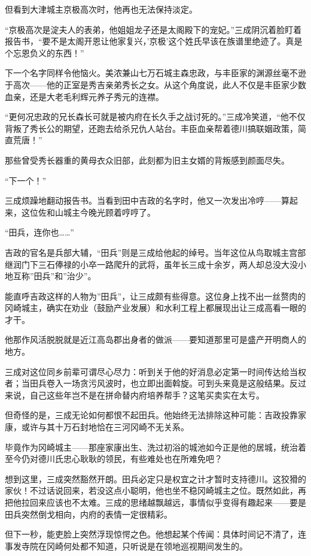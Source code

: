 \documentclass[
]{article}
\begin{document}
但看到大津城主京极高次时，他再也无法保持淡定。

``京极高次是淀夫人的表弟，他姐姐龙子还是太阁殿下的宠妃。''三成阴沉着脸盯着报告书，``要不是太阁开恩让他家复兴，'京极'这个姓氏早该在族谱里绝迹了。真是个忘恩负义的东西！''

下一个名字同样令他恼火。美浓兼山七万石城主森忠政，与丰臣家的渊源丝毫不逊于高次------他的正室是秀吉亲弟秀长之女。从这个角度说，此人不仅是丰臣家少数血亲，还是大老毛利辉元养子秀元的连襟。

``更何况忠政的兄长森长可就是被内府在长久手之战讨死的。''三成冷笑道，``他不仅背叛了秀长公的期望，还跑去给杀兄仇人站台。丰臣血亲帮着德川搞联姻政策，简直荒唐！''

那些曾受秀长器重的黄母衣众旧部，此刻都为旧主女婿的背叛感到颜面尽失。

``下一个！''

三成烦躁地翻动报告书。当看到田中吉政的名字时，他又一次发出冷哼------算起来，这位佐和山城主今晚光顾着哼哼了。

``田兵，连你也\ldots\ldots{}''

吉政的官名是兵部大辅，``田兵''则是三成给他起的绰号。当年这位从鸟取城主宫部继润门下三石俸禄的小卒一路爬升的武将，虽年长三成十余岁，两人却总没大没小地互称''田兵''和''治少''。

能直呼吉政这样的人物为''田兵''，让三成颇有些得意。这位身上找不出一丝赘肉的冈崎城主，确实在劝业（鼓励产业发展）和水利工程上都展现出让三成高看一眼的才干。

他那作风活脱脱就是近江高岛郡出身者的做派------要知道那里可是盛产开明商人的地方。

三成对这位同乡前辈可谓尽心尽力：听到关于他的好消息必定第一时间传达给当权者；当田兵卷入一场贪污风波时，也立即出面斡旋。可到头来竟是这般结果。反过来说，自己这些年岂不是在拼命替内府培养帮手？这笔买卖实在太亏。

但奇怪的是，三成无论如何都恨不起田兵。他始终无法排除这种可能：吉政投靠家康，或许与其十万石封地恰在三河冈崎不无关系。

毕竟作为冈崎城主------那座家康出生、洗过初浴的城池如今正是他的居城，统治着至今仍对德川氏忠心耿耿的领民，有些难处也在所难免吧？

想到这里，三成突然豁然开朗。田兵必定只是权宜之计才暂时支持德川。这狡猾的家伙！不过话说回来，若没这点小聪明，他也坐不稳冈崎城主之位。既然如此，再把他拉回来应该也不太难。三成的思绪越飘越远，事情似乎变得有趣起来------要是田兵突然倒戈相向，内府的表情一定很精彩。

但下一秒，能吏脸上突然浮现惊愕之色。他想起某个传闻：具体时间记不清了，连事发寺院在冈崎何处都不知道，只听说是在领地巡视期间发生的。
\end{document}
